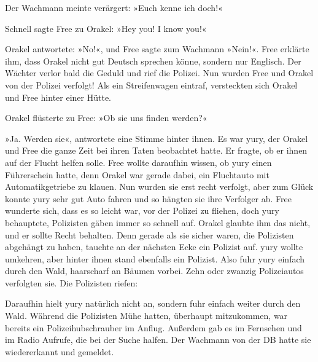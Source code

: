 Der Wachmann meinte verärgert: »Euch kenne ich doch!«

Schnell sagte Free zu Orakel: »Hey you! I know you!«

Orakel antwortete: »No!«, und Free sagte zum Wachmann »Nein!«. Free erklärte ihm, dass Orakel nicht gut Deutsch sprechen könne, sondern nur Englisch. Der Wächter verlor bald die Geduld und rief die Polizei. Nun wurden Free und Orakel von der Polizei verfolgt! Als ein Streifenwagen eintraf, versteckten sich Orakel und Free hinter einer Hütte.

Orakel flüsterte zu Free: »Ob sie uns finden werden?«

»Ja. Werden sie«, antwortete eine Stimme hinter ihnen. Es war yury, der Orakel und Free die ganze Zeit bei ihren Taten beobachtet hatte. Er fragte, ob er ihnen auf der Flucht helfen solle. Free wollte daraufhin wissen, ob yury einen Führerschein hatte, denn Orakel war gerade dabei, ein Fluchtauto mit Automatikgetriebe zu klauen. Nun wurden sie erst recht verfolgt, aber zum Glück konnte yury sehr gut Auto fahren und so hängten sie ihre Verfolger ab. Free wunderte sich, dass es so leicht war, vor der Polizei zu fliehen, doch yury behauptete, Polizisten gäben immer so schnell auf. Orakel glaubte ihm das nicht, und er sollte Recht behalten. Denn gerade als sie sicher waren, die Polizisten abgehängt zu haben, tauchte an der nächsten Ecke ein Polizist auf. yury wollte umkehren, aber hinter ihnen stand ebenfalls ein Polizist. Also fuhr yury einfach durch den Wald, haarscharf an Bäumen vorbei. Zehn oder zwanzig Polizeiautos verfolgten sie. Die Polizisten riefen:


Daraufhin hielt yury natürlich nicht an, sondern fuhr einfach weiter durch den Wald. Während die Polizisten Mühe hatten, überhaupt mitzukommen, war bereits ein Polizeihubschrauber im Anflug. Außerdem gab es im Fernsehen und im Radio Aufrufe, die bei der Suche halfen. Der Wachmann von der DB hatte sie wiedererkannt und gemeldet.

